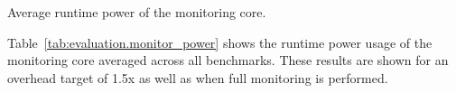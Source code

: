 \begin{table}[tb]
  \begin{center}
    \vspace{-0.0in}
    \begin{footnotesize}
    
    \end{footnotesize}
    \caption{Average runtime power of the monitoring core.}
    \vspace{-0.2in}
    \label{tab:evaluation.monitor_power}
  \end{center}
\end{table}

Table~\ref{tab:evaluation.monitor_power} shows the runtime power usage of the
monitoring core averaged across all benchmarks. These results are shown for an
overhead target of 1.5x as well as when full monitoring is performed.

